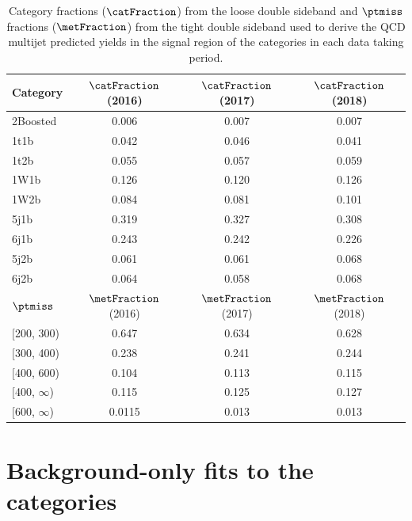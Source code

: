 \begin{table}[htbp]
    \centering
    \begin{tabular}{lccc}
    \toprule
    Category & $\catFraction$ (2016) & $\catFraction$ (2017) & $\catFraction$ (2018) \\\midrule
    2Boosted & 0.006 & 0.007 & 0.007 \\
    1t1b & 0.042 & 0.046 & 0.041 \\
    1t2b & 0.055 & 0.057 & 0.059 \\
    1W1b & 0.126 & 0.120 & 0.126 \\
    1W2b & 0.084 & 0.081 & 0.101 \\
    5j1b & 0.319 & 0.327 & 0.308 \\
    6j1b & 0.243 & 0.242 & 0.226 \\
    5j2b & 0.061 & 0.061 & 0.068 \\
    6j2b & 0.064 & 0.058 & 0.068 \\
    \midrule
    $\ptmiss$ & $\metFraction$ (2016) & $\metFraction$ (2017) & $\metFraction$ (2018) \\\midrule
    $\text{[}$200, 300) & 0.647 & 0.634 & 0.628 \\
    $\text{[}$300, 400) & 0.238 & 0.241 & 0.244 \\
    $\text{[}$400, 600) & 0.104 & 0.113 & 0.115 \\
    $\text{[}$400, $\infty$) & 0.115 & 0.125 & 0.127 \\
    $\text{[}$600, $\infty$) & 0.0115 & 0.013 & 0.013 \\
    \bottomrule
    \end{tabular}
    \caption{Category fractions ($\catFraction$) from the loose double sideband and $\ptmiss$ fractions ($\metFraction$) from the tight double sideband used to derive the QCD multijet predicted yields in the signal region of the \ttH categories in each data taking period.}
    \label{tab:qcd_cat_met_fracs_ttH}
\end{table}

\clearpage




\section{Background-only fits to the \texorpdfstring{\ttH}{ttH} categories}
\label{sec:B_only_fit_plots_ttH_SR}

